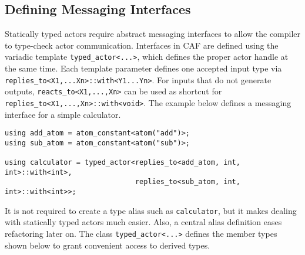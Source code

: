 \clearpage

\subsection{Defining Messaging Interfaces}

Statically typed actors require abstract messaging interfaces to allow the compiler to type-check actor communication.
Interfaces in CAF are defined using the variadic template \lstinline^typed_actor<...>^, which defines the proper actor handle at the same time.
Each template parameter defines one accepted input type via \lstinline^replies_to<X1,...Xn>::with<Y1...Yn>^.
For inputs that do not generate outputs, \lstinline^reacts_to<X1,...,Xn>^ can be used as shortcut for \lstinline^replies_to<X1,...,Xn>::with<void>^. The example below defines a messaging interface for a simple calculator.

\begin{lstlisting}
using add_atom = atom_constant<atom("add")>;
using sub_atom = atom_constant<atom("sub")>;

using calculator = typed_actor<replies_to<add_atom, int, int>::with<int>,
                               replies_to<sub_atom, int, int>::with<int>>;
\end{lstlisting}

It is not required to create a type alias such as \lstinline^calculator^, but it makes dealing with statically typed actors much easier.
Also, a central alias definition eases refactoring later on.
The class \lstinline^typed_actor<...>^ defines the member types shown below to grant convenient access to derived types.

